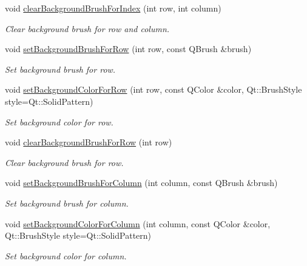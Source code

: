 \begin{DoxyCompactItemize}
void \hyperlink{class_mdt_1_1_item_model_1_1_format_proxy_model_a7918db73a8d35b36e92c53273ad9fada}{clear\+Background\+Brush\+For\+Index} (int row, int column)
\begin{DoxyCompactList}\small\item\em Clear background brush for row and column. \end{DoxyCompactList}\item 
void \hyperlink{class_mdt_1_1_item_model_1_1_format_proxy_model_ab1eeff6b79b8fc2985736c00dd68914b}{set\+Background\+Brush\+For\+Row} (int row, const Q\+Brush \&brush)
\begin{DoxyCompactList}\small\item\em Set background brush for row. \end{DoxyCompactList}\item 
void \hyperlink{class_mdt_1_1_item_model_1_1_format_proxy_model_a9ba93e3c407a165a349db859379cc474}{set\+Background\+Color\+For\+Row} (int row, const Q\+Color \&color, Qt\+::\+Brush\+Style style=Qt\+::\+Solid\+Pattern)
\begin{DoxyCompactList}\small\item\em Set background color for row. \end{DoxyCompactList}\item 
void \hyperlink{class_mdt_1_1_item_model_1_1_format_proxy_model_a6b7ff68464a943499f2098eed5edf118}{clear\+Background\+Brush\+For\+Row} (int row)
\begin{DoxyCompactList}\small\item\em Clear background brush for row. \end{DoxyCompactList}\item 
void \hyperlink{class_mdt_1_1_item_model_1_1_format_proxy_model_a884d224be7309dfee23c59e091a4d19d}{set\+Background\+Brush\+For\+Column} (int column, const Q\+Brush \&brush)
\begin{DoxyCompactList}\small\item\em Set background brush for column. \end{DoxyCompactList}\item 
void \hyperlink{class_mdt_1_1_item_model_1_1_format_proxy_model_a7ad11f6bb57b9571c560b9b7302ba120}{set\+Background\+Color\+For\+Column} (int column, const Q\+Color \&color, Qt\+::\+Brush\+Style style=Qt\+::\+Solid\+Pattern)
\begin{DoxyCompactList}\small\item\em Set background color for column. \end{DoxyCompactList}\item 

\end{DoxyCompactItemize}

